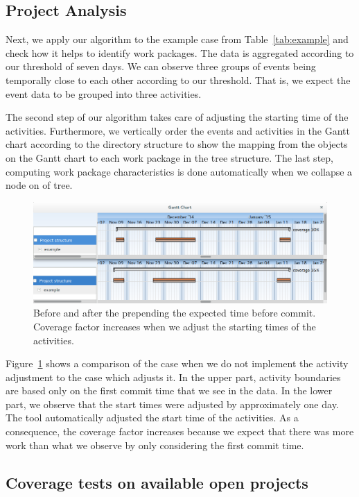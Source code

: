 \subsection{Project Analysis}
Next, we apply our algorithm to the example case from Table~\ref{tab:example} and check how it helps to identify work packages. The data is aggregated according to our threshold of seven days. We can observe three groups of events being temporally close to each other according to our threshold. That is, we expect the event data to be grouped into three activities.

The second step of our algorithm takes care of adjusting the starting time of the activities. Furthermore, we vertically order the events and activities in the Gantt chart according to the directory structure to show the mapping from the objects on the Gantt chart to each work package in the tree structure. The last step, computing work package characteristics is done automatically when we collapse a node on of tree.

\begin{figure}
\centering
\includegraphics[width=\textwidth]{bpm2015/imgs/coverage_before_and_after}
\caption{Before and after the prepending the expected time before commit. Coverage factor increases when we adjust the starting times of the activities.}
\label{fig:example-collapsed}
\end{figure}

Figure~\ref{fig:example-collapsed} shows a comparison of the case when we do not implement the activity adjustment to the case which adjusts it. In the upper part, activity boundaries are based only on the first commit time that we see in the data. In the lower part, we observe that the start times were adjusted by approximately one day. The tool automatically adjusted the start time of the activities. As a consequence, the coverage factor increases because we expect that there was more work than what we observe by only considering the first commit time.

\subsection{Coverage tests on available open projects}

